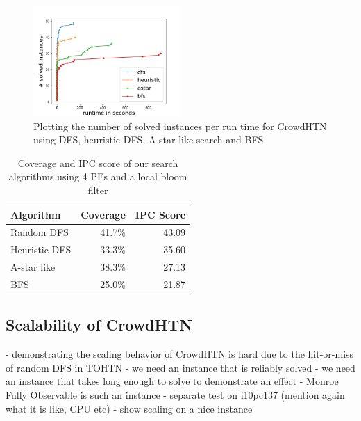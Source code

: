 \begin{figure}
	\caption{Plotting the number of solved instances per run time for CrowdHTN using DFS, heuristic DFS, A-star like search and BFS}
	\label{figure: eval algorithm}
	\centering
	\includegraphics[width=0.5\textwidth]{images/final/search_algorithms.png}
\end{figure}
\begin{table}
	\caption{Coverage and IPC score of our search algorithms using 4 PEs and a local bloom filter}
	\label{table: eval algorithm}
	\centering
	\begin{tabular}{| l | r | r |}
		\hline
		Algorithm 		& Coverage & IPC Score \\
		\hline
		Random DFS 		& 41.7\%	& 43.09 \\ %
		Heuristic DFS 	& 33.3\%	& 35.60	\\ %
		A-star like 	& 38.3\%	& 27.13 \\ %
		BFS 			& 25.0\%	& 21.87	\\ %
		\hline
	\end{tabular}
\end{table}

\subsection{Scalability of CrowdHTN}
\label{eval: scalability}
- demonstrating the scaling behavior of CrowdHTN is hard due to the hit-or-miss of random DFS in TOHTN
	- we need an instance that is reliably solved
	- we need an instance that takes long enough to solve to demonstrate an effect
	- Monroe Fully Observable is such an instance
- separate test on i10pc137 (mention again what it is like, CPU etc)
- show scaling on a nice instance

